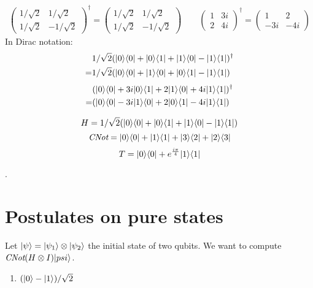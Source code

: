 \documentclass[12pt]{article}
\theoremstyle{exostyle}
\begin{document}
\begin{align*}
\left(\begin{array}{cc}
 1/\sqrt{2}& 1/\sqrt{2}\\
 1/\sqrt{2}& -1/\sqrt{2}
\end{array}\right)^\dagger
=
\left(\begin{array}{cc}
 1/\sqrt{2}& 1/\sqrt{2}\\
 1/\sqrt{2}& -1/\sqrt{2}
\end{array}\right)
\qquad
\left(\begin{array}{cc}
 1& 3i\\
 2& 4i
\end{array}\right)^\dagger
=
\left(\begin{array}{cc}
 1& 2\\
 -3i& -4i
\end{array}\right)
\end{align*}
In Dirac notation:
\begin{align*}
  &1/\sqrt 2 (| 0 \rangle \langle 0 | + | 0 \rangle \langle 1 | + | 1 \rangle \langle 0 | - | 1 \rangle \langle 1 |)^\dagger \\
  =&1/\sqrt 2 (| 0 \rangle \langle 0 | + | 1 \rangle \langle 0 | + | 0 \rangle \langle 1 | - | 1 \rangle \langle 1 |)
\end{align*}
\begin{align*}
  &(| 0 \rangle \langle 0 | + 3i | 0 \rangle \langle 1 | + 2 | 1 \rangle \langle 0 | + 4i | 1 \rangle \langle 1 |)^\dagger \\
  =&(| 0 \rangle \langle 0 | - 3i | 1 \rangle \langle 0 | + 2 | 0 \rangle \langle 1 | - 4i | 1 \rangle \langle 1 |)
\end{align*}


$$ H = 1/\sqrt 2 (| 0 \rangle \langle 0 |+| 0 \rangle \langle 1 |+| 1 \rangle \langle 0 |-| 1 \rangle \langle 1 |)$$
$$ \textit{CNot} = | 0 \rangle \langle 0 |+| 1 \rangle \langle 1 |+| 3 \rangle \langle 2 |+| 2 \rangle \langle 3 |$$
$$ T = | 0 \rangle \langle 0 | + e^{\frac{i\pi}{4}} | 1 \rangle \langle 1 |$$

.

\section{Postulates on pure states}

Let $| \psi \rangle = | \psi_1 \rangle \otimes | \psi_2 \rangle$ the initial state of two
qubits. We want to compute $\textit{CNot} (H \otimes I) | psi \rangle$.

\begin{enumerate}
  \item  $(| 0 \rangle - | 1 \rangle)/\sqrt 2$
\end{enumerate}
\end{document}
